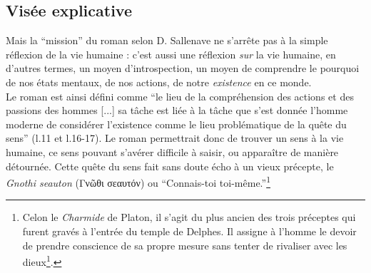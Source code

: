 \documentclass[a4paper,10pt]{article}
\begin{document}
		\subsection{Visée explicative}
			Mais la ``mission'' du roman selon D. Sallenave ne s'arrête pas à la simple réflexion de la vie humaine : c'est aussi une réflexion \textit{sur} la vie humaine, en d'autres termes, un moyen d'introspection, un moyen de comprendre le pourquoi de nos états mentaux, de nos actions, de notre \textit{existence} en ce monde.\\
			Le roman est ainsi défini comme  ``le lieu de la compréhension des actions et des passions des hommes [...] sa tâche est liée à la tâche que s'est donnée l'homme moderne de considérer l'existence comme le lieu problématique de la quête du sens'' (l.11 et l.16-17). Le roman permettrait donc de trouver un sens à la vie humaine, ce sens pouvant s'avérer difficile à saisir, ou apparaître de manière détournée. Cette quête du sens fait sans doute écho à un vieux précepte, le \textit{Gnothi seauton} (\textgreek{Γνῶθι σεαυτόν}) ou ``Connais-toi toi-même.''\footnote{Celon le \textit{Charmide} de Platon, il s'agit du plus ancien des trois préceptes qui furent gravés à l'entrée du temple de Delphes. Il assigne à l’homme le devoir de prendre conscience de sa propre mesure sans tenter de rivaliser avec les dieux\footcite{WikiGnothi}.}
\end{document}

